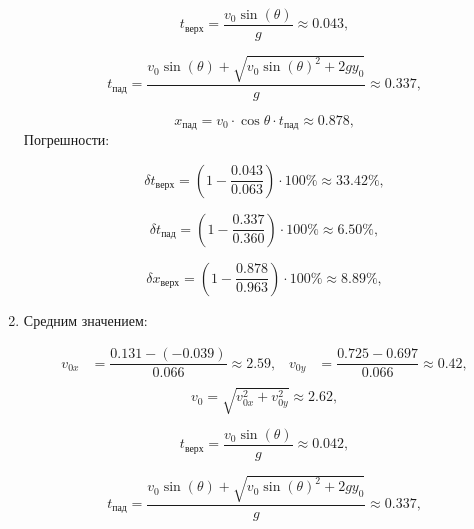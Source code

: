\documentclass{report}
\begin{document}
\begin{enumerate}
\begin{equation}
  t_{\text{верх}} = \dfrac{v_0 \sin(\theta)}{g}\approx 0.043\text{,}
\end{equation}

\begin{equation}
  t_{\text{пад}} = \dfrac{v_0 \sin(\theta)+\sqrt{v_0 \sin(\theta)^2+2 g y_0}}{g} \approx 0.337\text{,}
\end{equation}


\begin{equation}
  x_{\text{пад}} = v_0\cdot\cos{\theta}\cdot t_{\text{пад}} \approx 0.878\text{,}
\end{equation}
Погрешности:

\begin{equation}
  \delta t_{\text{верх}} = (1 - \dfrac{0.043}{0.063}) \cdot 100 \% \approx 33.42\% \text{,}
\end{equation}

\begin{equation}
  \delta t_{\text{пад}} = (1 - \dfrac{0.337}{0.360}) \cdot 100 \% \approx 6.50\% \text{,}
\end{equation}

\begin{equation}
  \delta x_{\text{верх}} = (1 - \dfrac{0.878}{0.963}) \cdot 100 \% \approx 8.89\% \text{,}
\end{equation}


\item Средним значением:

\begin{equation}
\begin{aligned}
  v_{0x} &= \dfrac{0.131 - (-0.039)}{0.066} \approx 2.59\text{,} \quad
  v_{0y} &= \dfrac{0.725 - 0.697}{0.066} \approx 0.42\text{,}\\
\end{aligned}
\end{equation}
    \begin{equation}
  v_0 = \sqrt{v_{0x}^2 + v_{0y}^2} \approx 2.62\text{,}
    \end{equation}

\begin{equation}
  t_{\text{верх}} = \dfrac{v_0 \sin(\theta)}{g}\approx 0.042\text{,}
\end{equation}

\begin{equation}
  t_{\text{пад}} = \dfrac{v_0 \sin(\theta)+\sqrt{v_0 \sin(\theta)^2+2 g y_0}}{g} \approx 0.337\text{,}
\end{equation}


\end{enumerate}
\end{document}
